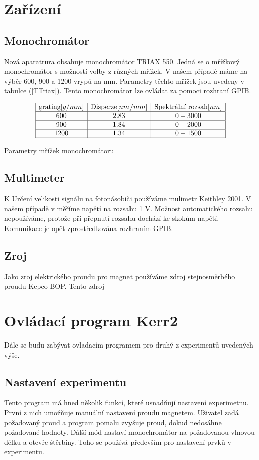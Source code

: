 \documentclass[a4paper,12pt]{article}
\begin{document}
\section{Zařízení}
\subsection{Monochromátor}
Nová aparatrura obsahuje monochromátor TRIAX 550. Jedná se o mřížkový monochromátor s možností volby z různých mřížek. V našem případě máme na výběr 600, 900 a 1200 vrypů na mm. Parametry těchto mřížek jsou uvedeny v tabulce (\ref{TTriax}). Tento monochromátor lze ovládat za pomoci rozhraní GPIB. 
\begin{table}
$$
\begin{array}{|c|c|c|}
\hline
\mbox{grating} [g/mm]&  \mbox{Disperze} [nm/mm]&    \mbox{Spektrální rozsah} [nm] \\ \hline
600&    2.83&   0 - 3000 \\ \hline
900&    1.84&   0 - 2000 \\ \hline
1200&   1.34&   0 - 1500 \\ \hline
\end{array}
$$
\caption{Parametry mřížek monochromátoru}
\label{TTriax}
\end{table}

\subsection{Multimeter}
K Určení velikosti signálu na fotonásobiči používáme mulimetr Keithley 2001. V našem případě v měříme napětí na rozsahu 1 V. Možnost automatického rozsahu nepoužíváme, protože při přepnutí rozsahu dochází ke skokům napětí. Komunikace je opět zprostředkována rozhraním GPIB.

\subsection{Zroj}
Jako zroj elektrického proudu pro magnet používáme zdroj stejnosměrbého proudu Kepco BOP. Tento zdroj


\section{Ovládací program Kerr2}
Dále se budu zabývat ovladacím programem pro druhý z experimentů uvedených výše. 

\subsection{Nastavení experimentu}
Tento program má hned několik funkcí, které usnadňují nastavení experimetnu. První z nich umožňuje manuální nastavení proudu magnetem. Uživatel zadá požadovaný proud a program pomalu zvyšuje proud, dokud nedosáhne požadované hodnoty. Dálší mód nastaví monochromátor na požadovanou vlnovou délku a otevře štěrbiny. Toho se používá především pro nastavení prvků v experimentu.
\end{document}
